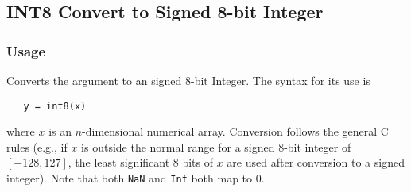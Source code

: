 %
%
%
\subsection{INT8 Convert to Signed 8-bit Integer}
\subsubsection{Usage}
Converts the argument to an signed 8-bit Integer.  The syntax
for its use is
\begin{verbatim}
   y = int8(x)
\end{verbatim}
where $x$ is an $n$-dimensional numerical array.  Conversion
follows the general C rules (e.g., if $x$ is outside the normal
range for a signed 8-bit integer of $[-128,127]$, the least significant
8 bits of $x$ are used after conversion to a signed integer).  Note that
both \verb|NaN| and \verb|Inf| both map to 0.
